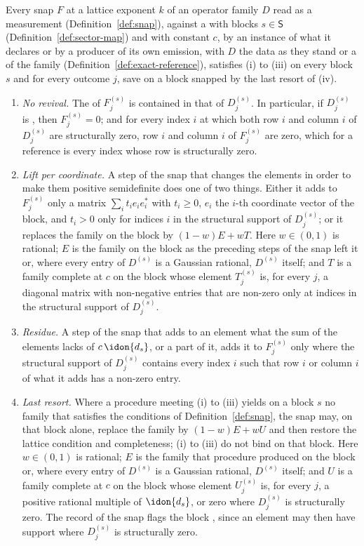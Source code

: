 \begin{requirement}\label{req:support-safe-snap}
Every snap $F$ at a lattice exponent $k$ of an operator family $D$ read as a
measurement (Definition~\ref{def:snap}), against a  with blocks
$s\in\mathsf{S}$ (Definition~\ref{def:sector-map}) and with constant $c$, by
an instance of what it declares or by a producer of its own emission, with
$D$ the data as they stand or a  of the family
(Definition~\ref{def:exact-reference}), satisfies (i) to (iii) on every block
$s$ and for every outcome $j$, save on a block snapped by the last resort of
(iv).
\begin{enumerate}[label=(\roman*),leftmargin=2.4em]
\item \emph{No revival.} The  of $F^{(s)}_j$ is
  contained in that of $D^{(s)}_j$. In particular, if $D^{(s)}_j$ is
  , then $F^{(s)}_j=0$; and for every index $i$ at
  which both row $i$ and column $i$ of $D^{(s)}_j$ are structurally zero,
  row $i$ and column $i$ of $F^{(s)}_j$ are zero, which for a reference is
  every index whose row is structurally zero.
\item \emph{Lift per coordinate.} A step of the snap that changes the
  elements in order to make them positive semidefinite does one of two
  things. Either it adds to $F^{(s)}_j$ only a matrix $\sum_it_ie_ie_i^{*}$
  with $t_i\ge0$, $e_i$ the $i$-th coordinate vector of the block, and
  $t_i>0$ only for indices $i$ in the structural support of $D^{(s)}_j$; or
  it replaces the family on the block by $(1-w)E+wT$. Here
  $w\in(0,1)$ is rational; $E$ is the family on the block as the
  preceding steps of the snap left it or, where every entry of $D^{(s)}$ is a Gaussian rational, $D^{(s)}$
  itself; and $T$ is a family complete at $c$ on the block whose element
  $T^{(s)}_j$ is, for every $j$, a diagonal matrix with non-negative entries
  that are non-zero only at indices in the structural support of
  $D^{(s)}_j$.
\item \emph{Residue.} A step of the snap that adds to an element what the sum
  of the elements lacks of $c\,\idon{d_s}$, or a part of it, adds it to
  $F^{(s)}_j$ only where the structural support of $D^{(s)}_j$ contains every
  index $i$ such that row $i$ or column $i$ of what it adds has a non-zero
  entry.
\item \emph{Last resort.} Where a procedure meeting (i) to (iii) yields on a
  block $s$ no family that satisfies the conditions of
  Definition~\ref{def:snap}, the snap may, on that block alone, replace the
  family by $(1-w)E+wU$ and then restore the lattice condition and
  completeness; (i) to (iii) do not bind on that block. Here $w\in(0,1)$ is
  rational; $E$ is the family that procedure produced on the block or, where
  every entry of $D^{(s)}$ is a Gaussian rational, $D^{(s)}$ itself; and $U$
  is a family complete at $c$ on the block whose element $U^{(s)}_j$ is, for
  every $j$, a positive rational multiple of $\idon{d_s}$, or zero where
  $D^{(s)}_j$ is structurally zero. The record of the snap flags the block
  , since an element may then have support
  where $D^{(s)}_j$ is structurally zero.
\end{enumerate}
\end{requirement}
